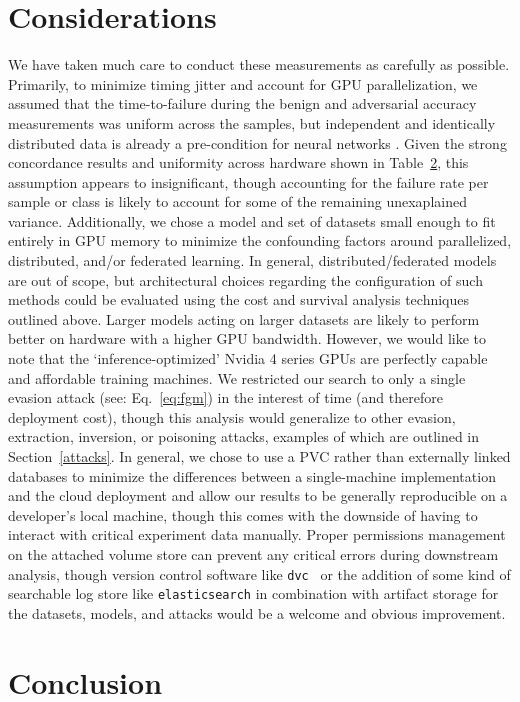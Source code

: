 \documentclass[conference]{IEEEtran}
\begin{document}
\section{Considerations}
 We have taken much care to conduct these measurements as carefully as possible. Primarily, to minimize timing jitter and account for GPU parallelization, we assumed that the time-to-failure during the benign and adversarial accuracy measurements was uniform across the samples, but independent and identically distributed data is already a pre-condition for neural networks \cite{}. Given the strong concordance results and uniformity across hardware shown in Table~\ref{}, this assumption appears to insignificant, though accounting for the failure rate per sample or class is likely to account for some of the remaining unexaplained variance. Additionally, we chose a model and set of datasets small enough to fit entirely in GPU memory to minimize the confounding factors around parallelized, distributed, and/or federated learning. In general, distributed/federated models are out of scope, but architectural choices regarding the configuration of such methods could be evaluated using the cost and survival analysis techniques outlined above. Larger models acting on larger datasets are likely to perform better on hardware with a higher GPU bandwidth. However, we would like to note that the `inference-optimized' Nvidia 4 series GPUs are perfectly capable and affordable training machines. We restricted our search to only a single evasion attack (see: Eq.~\ref{eq:fgm}) in the interest of time (and therefore deployment cost), though this analysis would generalize to other evasion, extraction, inversion, or poisoning attacks, examples of which are outlined in Section~\ref{attacks}. 
 In general, we chose to use a PVC rather than externally linked databases to minimize the differences between a single-machine implementation and the cloud deployment and allow our results to be generally reproducible on a developer's local machine, though this comes with the downside of having to interact with critical experiment data manually. Proper permissions management on the attached volume store can prevent any critical errors during downstream analysis, though version control software like \texttt{dvc}~\cite{dvc} or the addition of some kind of searchable log store like \texttt{elasticsearch}\cite{} in combination with artifact storage\cite{} for the datasets, models, and attacks would be a welcome and obvious improvement.
\section{Conclusion}

\newpage


\vspace{12pt}
\end{document}
